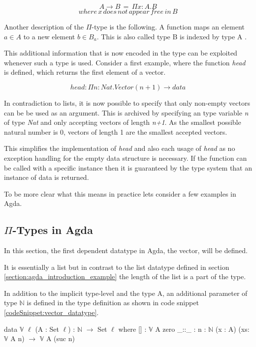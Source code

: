 $$A \rightarrow B \, = \, \Pi x:A.B$$
$$where \, x \, does \, not \, appear \, free \, in \, B$$

Another description of the $\Pi$-type is the following. A function maps an element $a \in A$ to a new element $b \in B_a$. 
This is also called type B is indexed by type A \cite{10.1145/2841316}.


This additional information that is now encoded in the type can be exploited whenever such a type is used. 
Consider a first example, where the function \emph{head} is defined, which returns the first element of a vector.

$$head : \Pi n : Nat.Vector(n+1) \rightarrow data$$

In contradiction to lists, it is now possible to specify that only non-empty vectors can be be used as an argument. 
This is archived by specifying an type variable \emph{n} of type \emph{Nat} and only accepting vectors of length \emph{n+1}.
As the smallest possible natural number is 0, vectors of length 1 are the smallest accepted vectors.

This simplifies the implementation of \emph{head} and also each usage of \emph{head} as no exception handling for the empty data structure is necessary. 
If the function can be called with a specific instance then it is guaranteed by the type system that an instance of data is returned.


To be more clear what this means in practice lets consider a few examples in Agda.

\subsection{$\Pi$-Types in Agda}\label{section_dependent_types_example}
In this section, the first dependent datatype in Agda, the vector, will be defined.

It is essentially a list but in contrast to the list datatype defined in section \ref{section:agda_introduction_example} the length of the list is a part of the type.

In addition to the implicit type-level and the type A, an additional parameter of type $\mathbb{N}$ is defined in the type definition as shown in code snippet \ref{codeSnippet:vector_datatype}.

\begin{codesnippet}[mathescape=true, caption={Definition of the vector datatype in Agda}, label={codeSnippet:vector_datatype}]
data $\mathbb{V}$ {$\ell$} (A : Set $\ell$) : $\mathbb{N}$ $\rightarrow$ Set $\ell$ where
  [] : $\mathbb{V}$ A zero
  _::_ : {n : $\mathbb{N}$} (x : A) (xs: $\mathbb{V}$ A n) $\rightarrow$
         $\mathbb{V}$ A (suc n)
\end{codesnippet}

